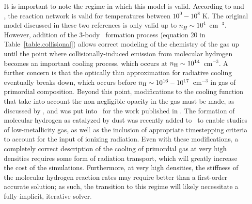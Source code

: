 It is important to note the regime in which this model is valid.
According to \citet{abel97} and \citet{anninos97},
the reaction network is valid for temperatures between $10^0 - 10^8$
K.  The original model discussed in these two references is only valid
up to $n_H \sim 10^4$~cm$^{-3}$.  However, addition of the 3-body
\HH~formation process (equation 20 in Table~\ref{table.collisional})
allows correct modeling of the chemistry of the gas up until the point
where collisionally-induced emission from molecular hydrogen becomes
an important cooling process, which occurs at $n_{\rm H} \sim
10^{14}$~cm$^{-3}$.  A further concern is that the optically thin
approximation for radiative cooling eventually breaks down, which occurs before
$n_{\rm H} \sim 10^{16} - 10^{17}$~cm$^{-3}$ in gas of primordial composition.  Beyond this point,
modifications to the cooling function that take into account the
non-negligible opacity in the gas must be made, as discussed by
\citet{2004MNRAS.348.1019R}, and was put into \enzo\ for the work
published in \citep{2009Sci...325..601T,2009PhDT.........5T}.   The formation
of molecular hydrogen as catalyzed by dust was recently added to \enzo\ to
enable studies of low-metallicity gas, as well as the inclusion of appropriate
timestepping criteria to account for the input of ionizing radiation.  Even
with these modifications, a completely correct description of the cooling of
primordial gas at very high densities requires some form of radiation
transport, which will greatly increase the cost of the simulations.
Furthermore, at very high densities, the stiffness of the molecular hydrogen
reaction rates may require better than a first-order accurate solution; as
such, the transition to this regime will likely necessitate a fully-implicit,
iterative solver.


